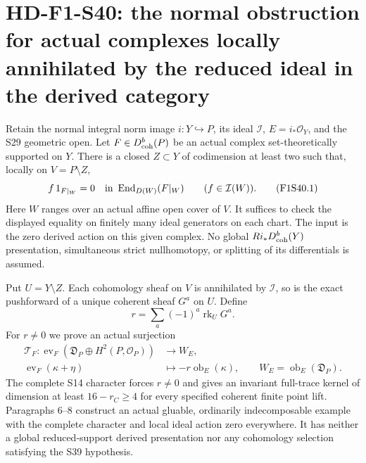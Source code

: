 \section[HD-F1-S40: local derived annihilation]{HD-F1-S40: the normal obstruction for actual complexes locally annihilated by the reduced ideal in the derived category}
\label{sec:f1-norm-fourfold-local-derived-annihilator}

Retain the normal integral norm image $i:Y\hookrightarrow P$,
its ideal $\mathcal I$, $E=i_*\mathcal O_Y$, and the S29
geometric open. Let $F\in D^b_{\rm coh}(P)$ be an actual
complex set-theoretically supported on $Y$.
There is a closed $Z\subset Y$ of codimension at least two
such that, locally on $V=P\setminus Z$,
\[
  f\,1_{F|_W}=0\quad\hbox{in }\operatorname{End}_{D(W)}(F|_W)
       \qquad(f\in\mathcal I(W)).
 \tag{F1S40.1}
\]
Here $W$ ranges over an actual affine open cover of $V$.
It suffices to check the displayed equality on finitely
many ideal generators on each chart. The input is the
zero derived action on this given complex. No global
$Ri_*D^b_{\rm coh}(Y)$ presentation, simultaneous strict
nullhomotopy, or splitting of its differentials is assumed.

Put $U=Y\setminus Z$. Each cohomology sheaf on $V$ is
annihilated by $\mathcal I$, so is the exact pushforward
of a unique coherent sheaf $G^a$ on $U$. Define
\[
       r=\sum_a(-1)^a\operatorname{rk}_U G^a.
 \tag{F1S40.2}
\]
For $r\ne0$ we prove an actual surjection
\[
\begin{split}
 \mathcal T_F:\operatorname{ev}_F
       (\mathfrak D_P\oplus H^2(P,\mathcal O_P))
          &\longrightarrow W_E,\\
 \operatorname{ev}_F(\kappa+\eta)
          &\longmapsto-r\operatorname{ob}_E(\kappa),
 \qquad W_E=\operatorname{ob}_E(\mathfrak D_P).
\end{split}
 \tag{F1S40.3}
\]
The complete S14 character forces $r\ne0$ and gives
an invariant full-trace kernel of dimension at least
$16-r_C\ge4$ for every specified coherent finite point
lift. Paragraphs 6--8 construct an actual gluable,
ordinarily indecomposable example with the complete
character and local ideal action zero everywhere.
It has neither a global reduced-support derived
presentation nor any cohomology selection satisfying
the S39 hypothesis.

